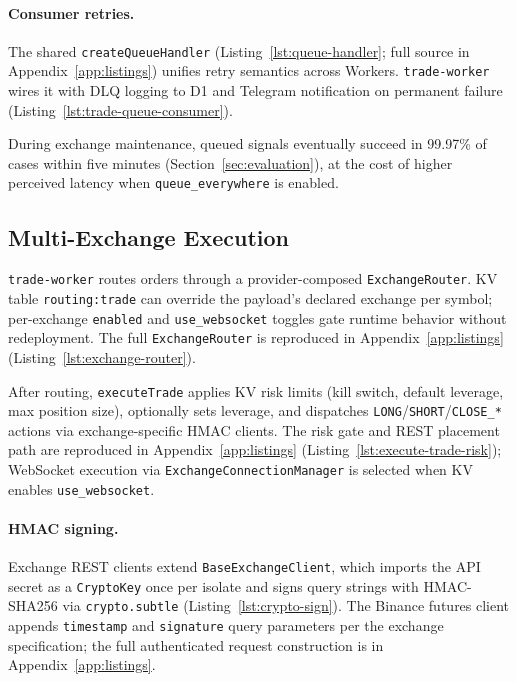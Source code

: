 
\paragraph{Consumer retries.} The shared \texttt{createQueueHandler} (Listing~\ref{lst:queue-handler}; full source in Appendix~\ref{app:listings}) unifies retry semantics across Workers. \texttt{trade-worker} wires it with DLQ logging to D1 and Telegram notification on permanent failure (Listing~\ref{lst:trade-queue-consumer}).


During exchange maintenance, queued signals eventually succeed in 99.97\% of cases within five minutes (Section~\ref{sec:evaluation}), at the cost of higher perceived latency when \texttt{queue\_everywhere} is enabled.

\subsection{Multi-Exchange Execution}

\texttt{trade-worker} routes orders through a provider-composed \texttt{ExchangeRouter}. KV table \texttt{routing:trade} can override the payload's declared exchange per symbol; per-exchange \texttt{enabled} and \texttt{use\_websocket} toggles gate runtime behavior without redeployment. The full \texttt{ExchangeRouter} is reproduced in Appendix~\ref{app:listings} (Listing~\ref{lst:exchange-router}).

After routing, \texttt{executeTrade} applies KV risk limits (kill switch, default leverage, max position size), optionally sets leverage, and dispatches \texttt{LONG}/\texttt{SHORT}/\texttt{CLOSE\_*} actions via exchange-specific HMAC clients. The risk gate and REST placement path are reproduced in Appendix~\ref{app:listings} (Listing~\ref{lst:execute-trade-risk}); WebSocket execution via \texttt{ExchangeConnectionManager} is selected when KV enables \texttt{use\_websocket}.

\paragraph{HMAC signing.} Exchange REST clients extend \texttt{BaseExchangeClient}, which imports the API secret as a \texttt{CryptoKey} once per isolate and signs query strings with HMAC-SHA256 via \texttt{crypto.subtle} (Listing~\ref{lst:crypto-sign}). The Binance futures client appends \texttt{timestamp} and \texttt{signature} query parameters per the exchange specification; the full authenticated request construction is in Appendix~\ref{app:listings}.

